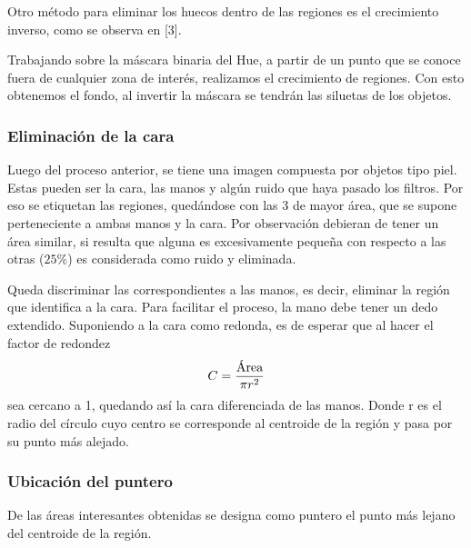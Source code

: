 \documentclass[portrait,a0paper,fontscale=0.277]{baposter}
\begin{document}
\begin{poster}
{			 Otro método  para  eliminar  los  huecos  dentro  de  las  regiones  es  el
			crecimiento inverso, como se observa en [3].

			Trabajando sobre la máscara binaria del Hue, a partir de  un  punto  que  se
			conoce fuera de cualquier zona de  interés,  realizamos  el  crecimiento  de
			regiones. Con esto obtenemos el fondo, al invertir  la  máscara  se  tendrán
			las siluetas de los objetos.


		\subsubsection*{Eliminación de la cara}


			Luego del proceso anterior, se tiene una imagen compuesta por  objetos  tipo
			piel. Estas pueden ser la cara, las manos y algún ruido que haya pasado  los
			filtros. Por eso se etiquetan las  regiones, quedándose con las 3  de  mayor
			área, que se supone perteneciente a ambas manos y la cara.  Por  observación
			debieran de tener un área similar, si resulta que  alguna  es  excesivamente
			pequeña con respecto a  las  otras  ($25 \%$)  es  considerada  como  ruido  y
			eliminada.

			Queda discriminar las correspondientes a las manos, es decir, eliminar la
			región que identifica a la cara. Para facilitar el proceso, la mano debe
			tener un dedo extendido. Suponiendo a la cara como redonda, es de esperar
			que al hacer el factor de  redondez
			\[ C = \frac{\makebox{Área}}{\pi r^2}\]
			sea cercano a 1, quedando así la cara diferenciada de las manos. Donde r  es
			el radio del círculo cuyo centro se corresponde al centroide de la región  y
			pasa por su punto más alejado.
		\subsubsection*{Ubicación del puntero}
De las áreas interesantes obtenidas se designa como puntero el punto más lejano del centroide de la región.

	}



\end{poster}
\end{document}
